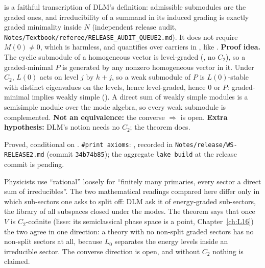 \begin{dictionary}
 is a faithful transcription of DLM's definition: admissible submodules are the graded ones, and
irreducibility of a summand in its induced grading is exactly graded minimality inside $N$ (independent release audit,
\texttt{Notes/\allowbreak Textbook/\allowbreak referee/\allowbreak RELEASE\_AUDIT\_QUEUE2.md}). It does not require
$M(0)\neq0$, which is harmless, and quantifies over carriers in , like .
\textbf{Proof idea.} The cyclic submodule of a homogeneous vector is level-graded (, no $C_2$),
so a graded-minimal $P$ is generated by any nonzero homogeneous vector in it. Under $C_2$, $L(0)$ acts on level $j$ by
$h+j$, so a weak submodule of $P$ is $L(0)$-stable with distinct eigenvalues on the levels, hence level-graded, hence
$0$ or $P$: graded-minimal implies weakly simple (). A direct sum of weakly simple
modules is a semisimple module over the mode algebra, so every weak submodule is complemented. \textbf{Not an
equivalence:} the converse  $\Rightarrow$  is open. \textbf{Extra hypothesis:}
DLM's notion needs no $C_2$; the theorem does.
\end{dictionary}

\begin{status}
Proved, conditional on . \texttt{\#print axioms}: \lean{[propext, Classical.}\allowbreak{}\allowbreak\lean{sound]},
recorded in \texttt{Notes/\allowbreak release/\allowbreak WS-RELEASE2.md} (commit \texttt{34b74b85}); the aggregate
\texttt{lake build} at the release commit is pending.
\end{status}

\begin{physics}
Physicists use ``rational'' loosely for ``finitely many primaries, every sector a direct sum of irreducibles''. The two
mathematical readings compared here differ only in which sub-sectors one asks to split off: DLM ask it of energy-graded
sub-sectors, the library of all subspaces closed under the modes. The theorem says that once $V$ is $C_2$-cofinite
(lisse: its semiclassical phase space is a point, Chapter~\ref{ch:L16}) the two agree in one direction: a theory with no
non-split graded sectors has no non-split sectors at all, because $L_0$ separates the energy levels inside an irreducible
sector. The converse direction is open, and without $C_2$ nothing is claimed.
\end{physics}

